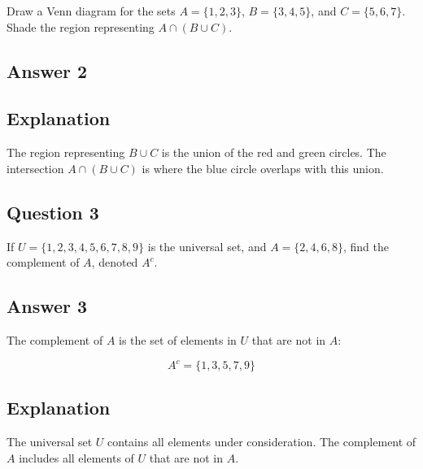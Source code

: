 \documentclass[12pt]{article}
\begin{document}
Draw a Venn diagram for the sets \(A = \{1, 2, 3\}\), \(B = \{3, 4, 5\}\), and \(C = \{5, 6, 7\}\). Shade the region representing \(A \cap (B \cup C)\).

\subsection*{Answer 2}

\begin{center}
\end{center}

\subsection*{Explanation}

The region representing \(B \cup C\) is the union of the red and green circles. The intersection \(A \cap (B \cup C)\) is where the blue circle overlaps with this union.

\subsection*{Question 3}

If \(U = \{1, 2, 3, 4, 5, 6, 7, 8, 9\}\) is the universal set, and \(A = \{2, 4, 6, 8\}\), find the complement of \(A\), denoted \(A^c\).

\subsection*{Answer 3}

The complement of \(A\) is the set of elements in \(U\) that are not in \(A\):

\[
A^c = \{1, 3, 5, 7, 9\}
\]

\subsection*{Explanation}

The universal set \(U\) contains all elements under consideration. The complement of \(A\) includes all elements of \(U\) that are not in \(A\).
\end{document}
